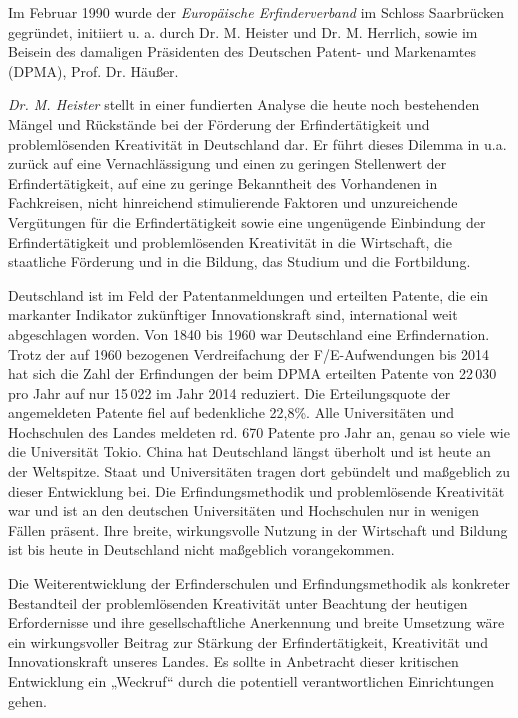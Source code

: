 \documentclass[11pt,a4paper]{article}
\begin{document}
Im Februar 1990 wurde der \emph{Europäische Erfinderverband} im Schloss
Saarbrücken gegründet, initiiert u. a. durch Dr. M. Heister und
Dr. M. Herrlich, sowie im Beisein des damaligen Präsidenten des Deutschen
Patent- und Markenamtes (DPMA), Prof. Dr. Häußer.

\emph{Dr. M. Heister} stellt in einer fundierten Analyse die heute noch
bestehenden Mängel und Rückstände bei der Förderung der Erfindertätigkeit und
problemlösenden Kreativität in Deutschland dar. Er führt dieses Dilemma in
\cite{16} u.a. zurück auf eine Vernachlässigung und einen zu geringen
Stellenwert der Erfindertätigkeit, auf eine zu geringe Bekanntheit des
Vorhandenen in Fachkreisen, nicht hinreichend stimulierende Faktoren und
unzureichende Vergütungen für die Erfindertätigkeit sowie eine ungenügende
Einbindung der Erfindertätig\-keit und problemlösenden Kreativität in die
Wirtschaft, die staatliche Förderung und in die Bildung, das Studium und die
Fortbildung.

Deutschland ist im Feld der Patentanmeldungen und erteilten Patente, die ein
markanter Indikator zukünftiger Innovationskraft sind, international weit
abgeschlagen worden. Von 1840 bis 1960 war Deutschland eine Erfindernation.
Trotz der auf 1960 bezogenen Verdreifachung der F/E-Aufwendungen bis 2014 hat
sich die Zahl der Erfindungen der beim DPMA erteilten Patente von 22\,030 pro
Jahr auf nur 15\,022 im Jahr 2014 reduziert. Die Erteilungsquote der
angemeldeten Patente fiel auf bedenkliche 22,8\%. Alle Universitäten und
Hochschulen des Landes meldeten rd. 670 Patente pro Jahr an, genau so viele
wie die Universität Tokio. China hat Deutschland längst überholt und ist heute
an der Weltspitze. Staat und Universitäten tragen dort gebündelt und
maßgeblich zu dieser Entwicklung bei. Die Erfindungsmethodik und
problemlösende Kreativität war und ist an den deutschen Universitäten und
Hochschulen nur in wenigen Fällen präsent. Ihre breite, wirkungsvolle Nutzung
in der Wirtschaft und Bildung ist bis heute in Deutschland nicht maßgeblich
vorangekommen.

Die Weiterentwicklung der Erfinderschulen und Erfindungsmethodik als konkreter
Bestandteil der problemlösenden Kreativität unter Beachtung der heutigen
Erfordernisse und ihre gesellschaftliche Anerkennung und breite Umsetzung wäre
ein wirkungsvoller Beitrag zur Stärkung der Erfindertätigkeit, Kreativität und
Innovationskraft unseres Landes. Es sollte in Anbetracht dieser kritischen
Entwicklung ein „Weckruf“ durch die potentiell verantwortlichen Einrichtungen
gehen.
\end{document}
